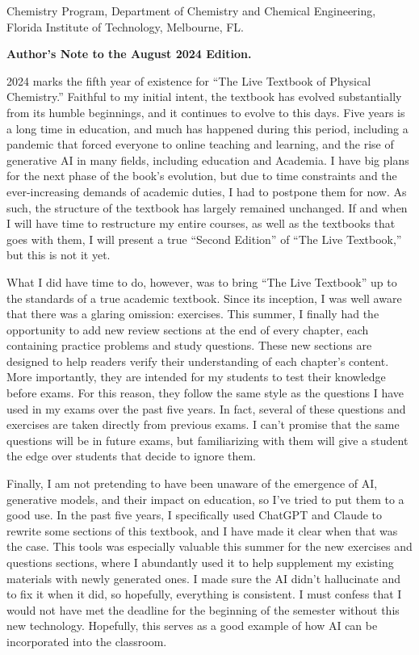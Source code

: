 \documentclass[
  9pt,
]{extbook}
\theoremstyle{definition}
\theoremstyle{definition}
\theoremstyle{definition}
\theoremstyle{definition}
\theoremstyle{remark}
\begin{document}
Chemistry Program, Department of Chemistry and Chemical Engineering,
Florida Institute of Technology, Melbourne, FL.

\textbf{Author's Note to the August 2024 Edition.}

2024 marks the fifth year of existence for ``The Live Textbook of Physical Chemistry.'' Faithful to my initial intent, the textbook has evolved substantially from its humble beginnings, and it continues to evolve to this days. Five years is a long time in education, and much has happened during this period, including a pandemic that forced everyone to online teaching and learning, and the rise of generative AI in many fields, including education and Academia. I have big plans for the next phase of the book's evolution, but due to time constraints and the ever-increasing demands of academic duties, I had to postpone them for now. As such, the structure of the textbook has largely remained unchanged. If and when I will have time to restructure my entire courses, as well as the textbooks that goes with them, I will present a true ``Second Edition'' of ``The Live Textbook,'' but this is not it yet.

What I did have time to do, however, was to bring ``The Live Textbook'' up to the standards of a true academic textbook. Since its inception, I was well aware that there was a glaring omission: exercises. This summer, I finally had the opportunity to add new review sections at the end of every chapter, each containing practice problems and study questions. These new sections are designed to help readers verify their understanding of each chapter's content. More importantly, they are intended for my students to test their knowledge before exams. For this reason, they follow the same style as the questions I have used in my exams over the past five years. In fact, several of these questions and exercises are taken directly from previous exams. I can't promise that the same questions will be in future exams, but familiarizing with them will give a student the edge over students that decide to ignore them.

Finally, I am not pretending to have been unaware of the emergence of AI, generative models, and their impact on education, so I've tried to put them to a good use. In the past five years, I specifically used ChatGPT and Claude to rewrite some sections of this textbook, and I have made it clear when that was the case. This tools was especially valuable this summer for the new exercises and questions sections, where I abundantly used it to help supplement my existing materials with newly generated ones. I made sure the AI didn't hallucinate and to fix it when it did, so hopefully, everything is consistent. I must confess that I would not have met the deadline for the beginning of the semester without this new technology. Hopefully, this serves as a good example of how AI can be incorporated into the classroom.
\end{document}

